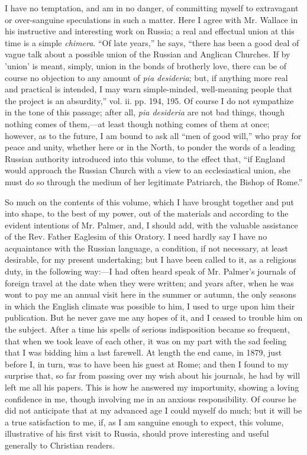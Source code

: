 I have no temptation, and am in no danger, of
committing myself to extravagant or over-sanguine speculations in such
a matter. Here I agree with Mr. Wallace in his instructive and
interesting work on Russia; a real and effectual union at this time is
a simple \emph{chimera}. ``Of late years,'' he says, ``there has been a
good deal of vague talk about a possible union of the Russian
and Anglican Churches. If by 'union' is meant, simply, union in the
bonds of brotherly love, there can be of course no objection to any
amount of \emph{pia desideria}; but, if anything more real and
practical is intended, I may warn simple-minded, well-meaning people
that the project is an absurdity,'' vol. ii. pp. 194, 195. Of course I
do not sympathize in the tone of this passage; after all, \emph{pia
desideria} are not bad things, though nothing comes of them,—at
least though nothing comes of them at once; however, as to the future,
I am bound to ask all ``men of good will,'' who pray for peace and
unity, whether here or in the North, to ponder the words of a leading
Russian authority introduced into this volume, to the effect that, ``if
England would approach the Russian Church with a view to an
ecclesiastical union, she must do so through the medium of her
legitimate Patriarch, the Bishop of Rome.''

So much on the contents of this volume, which I
have brought together and put into shape, to the best of my power, out
of the materials and according to the evident intentions of Mr.
Palmer, and, I should add, with the valuable assistance of the Rev.
Father Eaglesim of this Oratory. I need hardly say I have no
acquaintance with the Russian language, a condition, if not necessary,
at least desirable, for my present undertaking; but I have been called
to it, as a religious duty, in the following way:—I had often heard
speak of Mr. Palmer's journals of foreign travel at the date when they
were written; and years after, when he was wont to pay me an annual
visit here in the summer or autumn, the only seasons in which the
English climate was possible to him, I used to urge upon him their
publication. But he never gave me any hopes of it, and I ceased to
trouble him on the subject. After a time his spells of serious
indisposition became so frequent, that when we took leave of each
other, it was on my part with the sad feeling that I was bidding
him a last farewell. At length the end came, in 1879, just before I,
in turn, was to have been his guest at Rome; and then I found to my
surprise that, so far from passing over my wish about his journals, he
had by will left me all his papers. This is how he answered my
importunity, showing a loving confidence in me, though involving me in
an anxious responsibility. Of course he did not anticipate that at my
advanced age I could myself do much; but it will be a true
satisfaction to me, if, as I am sanguine enough to expect, this
volume, illustrative of his first visit to Russia, should prove
interesting and useful generally to Christian readers.


